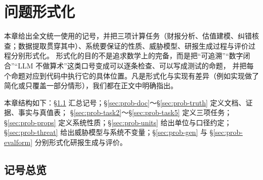 \section{问题形式化}
\label{sec:problem}

本章给出全文统一使用的记号，并把三项计算任务（财报分析、估值建模、纠错核查；数据提取贯穿其中）、系统要保证的性质、威胁模型、研报生成过程与评价过程分别形式化。
形式化的目的不是追求数学上的完备，而是把“可追溯”“数字闭合”“LLM 不做算术”这类口号变成可以逐条检查、可以写成测试的命题，
并把每个命题对应到代码中执行它的具体位置。凡是形式化与实现有差异（例如实现做了简化或只覆盖一部分情形），我们都在正文中明确指出。

本章结构如下：\S\ref{sec:prob-notation} 汇总记号；\S\ref{sec:prob-doc}～\S\ref{sec:prob-truth} 定义文档、证据、事实与真值表；
\S\ref{sec:prob-task2}～\S\ref{sec:prob-task5} 定义三项任务；\S\ref{sec:prob-props} 定义系统性质；\S\ref{sec:prob-units} 给出单位与口径约定；
\S\ref{sec:prob-threat} 给出威胁模型与系统不变量；\S\ref{sec:prob-gen} 与 \S\ref{sec:prob-evalform} 分别形式化研报生成与评价。

\subsection{记号总览}
\label{sec:prob-notation}

